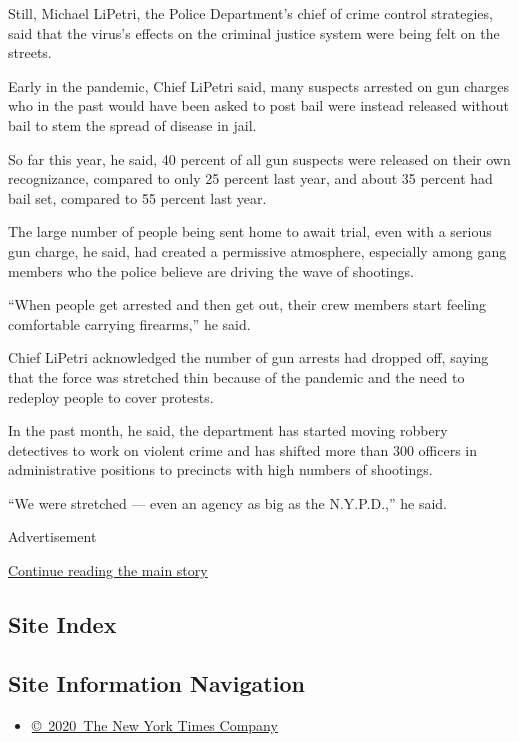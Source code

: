 Still, Michael LiPetri, the Police Department's chief of crime control
strategies, said that the virus's effects on the criminal justice system
were being felt on the streets.

Early in the pandemic, Chief LiPetri said, many suspects arrested on gun
charges who in the past would have been asked to post bail were instead
released without bail to stem the spread of disease in jail.

So far this year, he said, 40 percent of all gun suspects were released
on their own recognizance, compared to only 25 percent last year, and
about 35 percent had bail set, compared to 55 percent last year.

The large number of people being sent home to await trial, even with a
serious gun charge, he said, had created a permissive atmosphere,
especially among gang members who the police believe are driving the
wave of shootings.

``When people get arrested and then get out, their crew members start
feeling comfortable carrying firearms,'' he said.

Chief LiPetri acknowledged the number of gun arrests had dropped off,
saying that the force was stretched thin because of the pandemic and the
need to redeploy people to cover protests.

In the past month, he said, the department has started moving robbery
detectives to work on violent crime and has shifted more than 300
officers in administrative positions to precincts with high numbers of
shootings.

``We were stretched --- even an agency as big as the N.Y.P.D.,'' he
said.

Advertisement

\protect\hyperlink{after-bottom}{Continue reading the main story}

\hypertarget{site-index}{%
\subsection{Site Index}\label{site-index}}

\hypertarget{site-information-navigation}{%
\subsection{Site Information
Navigation}\label{site-information-navigation}}

\begin{itemize}
\tightlist
\item
  \href{https://help.nytimes3xbfgragh.onion/hc/en-us/articles/115014792127-Copyright-notice}{©~2020~The
  New York Times Company}
\end{itemize}

